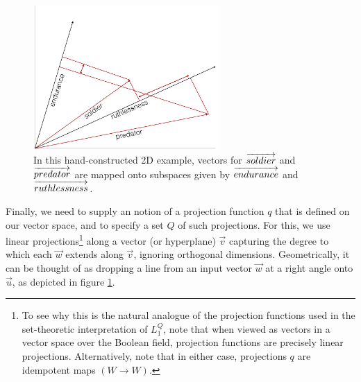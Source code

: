 \documentclass[OpenMind]{stjour}
\newcommand{\Listener}{L}
\newcommand{\QLONE}{\Listener_{{1}}^{{Q}}}
\begin{document}
		\begin{figure}
		\centering
			\includegraphics[height=5.5cm]{images/diagram2.png}
			\caption{In this hand-constructed 2D example, vectors for $\protect\overrightarrow{soldier}$ and $\protect\overrightarrow{predator}$ are mapped onto subspaces given by $\protect\overrightarrow{endurance}$ and $\protect\overrightarrow{ruthlessness}$.}
			\label{fig:1}
		\end{figure}

		Finally, we need to supply an notion of a projection function $q$ that is defined on our vector space, and to specify a set $Q$ of such projections. 
		For this, we use linear projections\footnote{To see why this is the natural analogue of the projection functions used in the set-theoretic interpretation of $\QLONE$, note that when viewed as vectors in a vector space over the Boolean field, projection functions are precisely linear projections. Alternatively, note that in either case, projections $q$ are idempotent maps $(W\to W)$.} along a vector (or hyperplane) $\overrightarrow{v}$ 
		capturing the degree to which each $\overrightarrow{w}$ extends along $\overrightarrow{v}$, ignoring orthogonal dimensions. Geometrically, it can be thought of as dropping a line from an input vector $\overrightarrow{w}$ at a right angle onto $\overrightarrow{u}$, as depicted in figure \ref{fig:1}.
\end{document}
